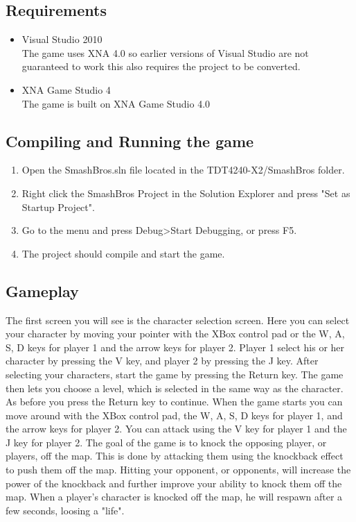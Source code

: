 \subsection{Requirements}
\begin{itemize}
\item Visual Studio 2010 \cite{bib:visualstudio}\\
The game uses XNA 4.0 so earlier versions of Visual Studio are not guaranteed to work this also requires the project to be converted.

\item XNA Game Studio 4 \cite{bib:xna}\\
The game is built on XNA Game Studio 4.0
\end{itemize}

\subsection{Compiling and Running the game}
\begin{enumerate}
\item Open the SmashBros.sln file located in the TDT4240-X2/SmashBros folder.\\
\item Right click the SmashBros Project in the Solution Explorer and press "Set as Startup Project".\\
\item Go to the menu and press Debug>Start Debugging, or press F5.\\
\item The project should compile and start the game.
\end{enumerate}

\subsection{Gameplay}
The first screen you will see is the character selection screen. Here you can select your character by moving your pointer with the XBox control pad or the W, A, S, D keys for player 1 and the arrow keys for player 2. Player 1 select his or her character by pressing the V key, and player 2 by pressing the J key. After selecting your characters, start the game by pressing the Return key. The game then lets you choose a level, which is selected in the same way as the character. As before you press the Return key to continue. When the game starts you can move around with the XBox control pad, the W, A, S, D keys for player 1, and the arrow keys for player 2. You can attack using the V key for player 1 and the J key for player 2. The goal of the game is to knock the opposing player, or players, off the map. This is done by attacking them using the knockback effect to push them off the map. Hitting your opponent, or opponents, will increase the power of the knockback and further improve your ability to knock them off the map. When a player's character is knocked off the map, he will respawn after a few seconds, loosing a "life".
